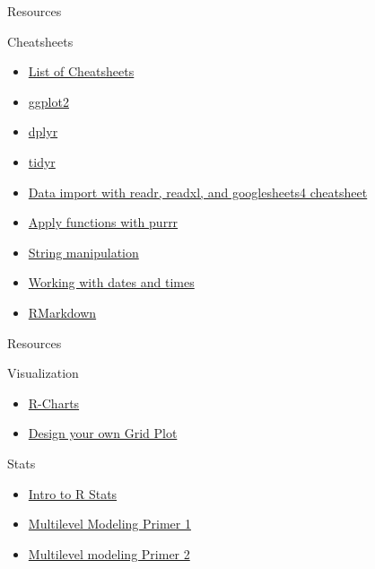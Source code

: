\documentclass[
  ignorenonframetext,
]{beamer}
\providecommand{\tightlist}{%
  \setlength{\itemsep}{0pt}\setlength{\parskip}{0pt}}
\begin{document}
\begin{frame}{Resources}
\protect\hypertarget{resources-1}{}
\begin{block}{Cheatsheets}
\protect\hypertarget{cheatsheets}{}
\begin{itemize}
\tightlist
\item
  \href{https://www.rstudio.com/resources/cheatsheets/}{List of
  Cheatsheets}
\item
  \href{https://raw.githubusercontent.com/rstudio/cheatsheets/main/data-visualization.pdf}{ggplot2}
\item
  \href{https://raw.githubusercontent.com/rstudio/cheatsheets/main/data-transformation.pdf}{dplyr}
\item
  \href{https://raw.githubusercontent.com/rstudio/cheatsheets/main/tidyr.pdf}{tidyr}
\item
  \href{https://raw.githubusercontent.com/rstudio/cheatsheets/main/data-import.pdf}{Data
  import with readr, readxl, and googlesheets4 cheatsheet}
\item
  \href{https://raw.githubusercontent.com/rstudio/cheatsheets/main/purrr.pdf}{Apply
  functions with purrr}
\item
  \href{https://raw.githubusercontent.com/rstudio/cheatsheets/main/strings.pdf}{String
  manipulation}
\item
  \href{https://raw.githubusercontent.com/rstudio/cheatsheets/main/lubridate.pdf}{Working
  with dates and times}
\item
  \href{https://raw.githubusercontent.com/rstudio/cheatsheets/main/rmarkdown.pdf}{RMarkdown}
\end{itemize}
\end{block}
\end{frame}

\begin{frame}{Resources}
\protect\hypertarget{resources-2}{}
\begin{block}{Visualization}
\protect\hypertarget{visualization}{}
\begin{itemize}
\tightlist
\item
  \href{https://r-charts.com/}{R-Charts}
\item
  \href{https://cran.r-project.org/web/packages/cowplot/vignettes/introduction.html}{Design
  your own Grid Plot}
\end{itemize}
\end{block}

\begin{block}{Stats}
\protect\hypertarget{stats}{}
\begin{itemize}
\tightlist
\item
  \href{https://www.cyclismo.org/tutorial/R/}{Intro to R Stats}
\item
  \href{https://quantdev.ssri.psu.edu/tutorials/r-bootcamp-introduction-multilevel-model-and-interactions}{Multilevel
  Modeling Primer 1}
\item
  \href{https://rpubs.com/rslbliss/r_mlm_ws}{Multilevel modeling Primer
  2}
\end{itemize}
\end{block}
\end{frame}
\end{document}
